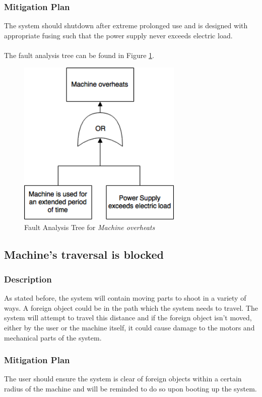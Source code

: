 \documentclass[11pt]{article}
\begin{document}
\subsubsection*{Mitigation Plan}
The system should shutdown after extreme prolonged use and is designed with appropriate fusing such that the power supply never exceeds electric load. \\ \\

The fault analysis tree can be found in Figure \ref{fig:ft-overheat}.

\begin{figure}[H]
   \centering
   \includegraphics[width=0.7\textwidth]{img/ft-overheat.png} %
   \caption{Fault Analysis Tree for \textit{Machine overheats}}
   \label{fig:ft-overheat}
\end{figure}

\subsection{Machine's traversal is blocked}
\subsubsection*{Description}
As stated before, the system will contain moving parts to shoot in a variety of ways. A foreign object could be in the path which the system needs to travel. The system will attempt to travel this distance and if the foreign object isn't moved, either by the user or the machine itself, it could cause damage to the motors and mechanical parts of the system.
\subsubsection*{Mitigation Plan}
The user should ensure the system is clear of foreign objects within a certain radius of the machine and will be reminded to do so upon booting up the system. \\ \\
\end{document}
